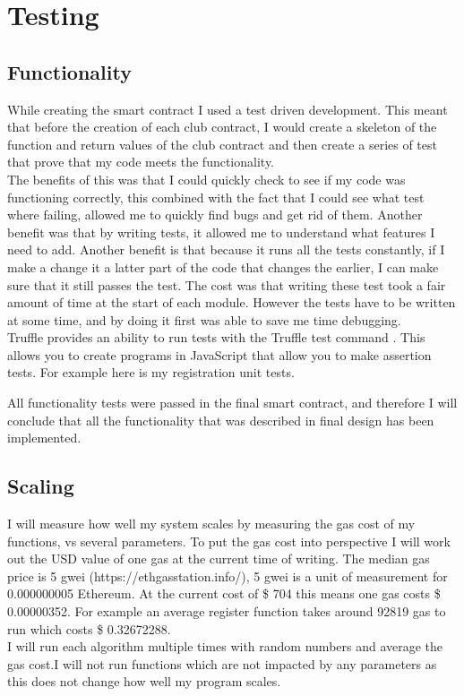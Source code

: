 \chapter{Testing} \label{Chapter: Testing}
\section{Functionality}
While creating the smart contract I used a test driven development. This meant that before the creation of each club contract, I would create a skeleton of the function and return values of the club contract and then create a series of test that prove that my code meets the functionality. \\
The benefits of this was that I could quickly check to see if my code was functioning correctly, this combined with the fact that I could see what test where failing, allowed me to quickly find bugs and get rid of them. Another benefit was that by writing tests, it allowed me to understand what features I need to add. Another benefit is that because it runs all the tests constantly, if I make a change it a latter part of the code that changes the earlier, I can make sure that it still passes the test. The cost was that writing these test took a fair amount of time at the start of each module. However the tests have to be written at some time, and by doing it first was able to save me time debugging.\\
Truffle provides an ability to run tests with the Truffle test command \citep{truffletest:2018:pdflatex}. This allows you to create programs in JavaScript that allow you to make assertion tests. For example here is my registration unit tests. 

All functionality tests were passed in the final smart contract, and therefore I will conclude that all the functionality that was described in final design has been implemented.
\section{Scaling}
I will measure how well my system scales by measuring the gas cost of my functions, vs several parameters. To put the gas cost into perspective I will work out the USD value of one gas at the current time of writing. The median gas price is 5 gwei (https://ethgasstation.info/), 5 gwei is a unit of measurement for 0.000000005 Ethereum. At the current cost of \$ 704 this means one gas costs  \$ 0.00000352. For example an average register function takes around 92819 gas to run which costs \$ 0.32672288. \\
I will run each algorithm multiple times with random numbers and average the gas cost.I will not run functions which are not impacted by any parameters as this does not change how well my program scales. 
